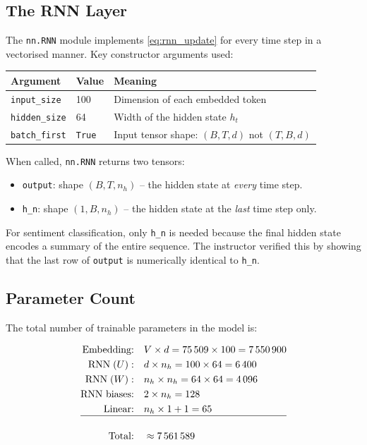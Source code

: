 \documentclass[12pt,a4paper]{article}
\begin{document}
\subsection{The RNN Layer}
\label{subsec:rnn_layer}

The \texttt{nn.RNN} module implements \cref{eq:rnn_update} for every
time step in a vectorised manner.  Key constructor arguments used:

\begin{center}
  \begin{tabular}{lll}
    \toprule
    \textbf{Argument} & \textbf{Value} & \textbf{Meaning} \\
    \midrule
    \texttt{input\_size}  & 100  & Dimension of each embedded token \\
    \texttt{hidden\_size} & 64   & Width of the hidden state $h_t$ \\
    \texttt{batch\_first} & \texttt{True} & Input tensor shape: $(B, T, d)$ not $(T, B, d)$ \\
    \bottomrule
  \end{tabular}
\end{center}

When called, \texttt{nn.RNN} returns two tensors:
\begin{itemize}[noitemsep]
  \item \texttt{output}: shape $(B, T, n_h)$ -- the hidden state at
        \emph{every} time step.
  \item \texttt{h\_n}: shape $(1, B, n_h)$ -- the hidden state at the
        \emph{last} time step only.
\end{itemize}

For sentiment classification, only \texttt{h\_n} is needed because
the final hidden state encodes a summary of the entire sequence.
The instructor verified this by showing that the last row of
\texttt{output} is numerically identical to \texttt{h\_n}.

\subsection{Parameter Count}
\label{subsec:param_count}

The total number of trainable parameters in the model is:

\begin{align}
  \text{Embedding:} &\quad V \times d = 75\,509 \times 100 = 7\,550\,900 \label{eq:emb_params} \\
  \text{RNN} \;(U): &\quad d \times n_h = 100 \times 64 = 6\,400 \label{eq:rnn_u} \\
  \text{RNN} \;(W): &\quad n_h \times n_h = 64 \times 64 = 4\,096 \label{eq:rnn_w} \\
  \text{RNN biases:}&\quad 2 \times n_h = 128 \label{eq:rnn_bias} \\
  \text{Linear:}    &\quad n_h \times 1 + 1 = 65 \label{eq:fc_params} \\
  \hline \nonumber \\
  \text{Total:}     &\quad \approx 7\,561\,589 \label{eq:total_params}
\end{align}
\end{document}
